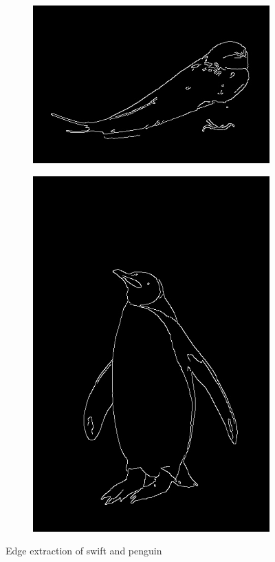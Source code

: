 \documentclass[conference]{IEEEtran}
\begin{document}
			\begin{figure}[!t]
				\centering
				\begin{subfigure}[!t]{0.48\linewidth}
					\centerline{\includegraphics[width=0.9\linewidth]{imgs/swallow_edges.jpg}}
				\end{subfigure}
				\begin{subfigure}[!t]{0.48\linewidth}
					\centerline{\includegraphics[height=0.4\textheight]{imgs/penguin_edges.jpg}}
				\end{subfigure}
				\caption{Edge extraction of swift and penguin}
				\label{fig:8}
			\end{figure}
		
\end{document}
